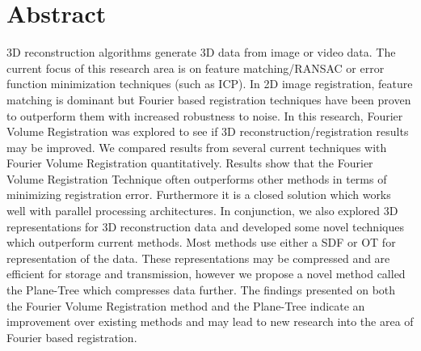 \makeatletter
\chapter{Abstract}

3D reconstruction algorithms generate 3D data from image or video data. The current focus of this research area is on feature matching/RANSAC or error function minimization techniques (such as ICP). In 2D image registration, feature matching is dominant but Fourier based registration techniques have been proven to outperform them with increased robustness to noise. In this research, Fourier Volume Registration was explored to see if 3D reconstruction/registration results may be improved. We compared results from several current techniques with Fourier Volume Registration quantitatively. Results show that the Fourier Volume Registration Technique often outperforms other methods in terms of minimizing registration error. Furthermore it is a closed solution which works well with parallel processing architectures. In conjunction, we also explored 3D representations for 3D reconstruction data and developed some novel techniques which outperform current methods. Most methods use either a SDF or OT for representation of the data. These representations may be compressed and are efficient for storage and transmission, however we propose a novel method called the Plane-Tree which compresses data further. The findings presented on both the Fourier Volume Registration method and the Plane-Tree indicate an improvement over existing methods and may lead to new research into the area of Fourier based registration.


